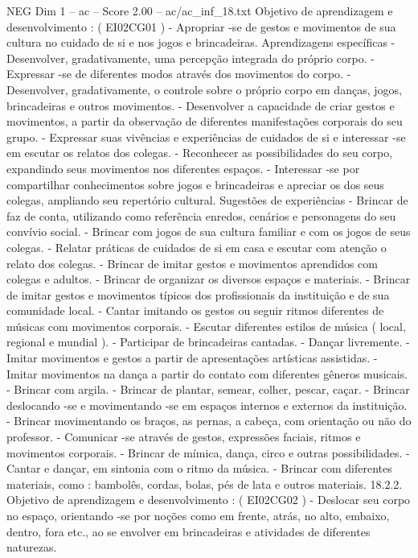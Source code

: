 \begin{textsample}{NEG Dim 1 – ac – Score 2.00 – ac/ac\_inf\_18.txt}
Objetivo de aprendizagem e desenvolvimento : ( EI02CG01 ) - Apropriar -se de gestos e movimentos de sua cultura no cuidado de si e nos jogos e brincadeiras.
Aprendizagens específicas - Desenvolver, gradativamente, uma percepção integrada do próprio corpo. - Expressar -se de diferentes modos através dos movimentos do corpo. - Desenvolver, gradativamente, o controle sobre o próprio corpo em danças, jogos, brincadeiras e outros movimentos. - Desenvolver a capacidade de criar gestos e movimentos, a partir da observação de diferentes manifestações corporais do seu grupo. - Expressar suas vivências e experiências de cuidados de si e interessar -se em escutar os relatos dos colegas. - Reconhecer as possibilidades do seu corpo, expandindo seus movimentos nos diferentes espaços. - Interessar -se por compartilhar conhecimentos sobre jogos e brincadeiras e apreciar os dos seus colegas, ampliando seu repertório cultural.
Sugestões de experiências - Brincar de faz de conta, utilizando como referência enredos, cenários e personagens do seu convívio social. - Brincar com jogos de sua cultura familiar e com os jogos de seus colegas. - Relatar práticas de cuidados de si em casa e escutar com atenção o relato dos colegas. - Brincar de imitar gestos e movimentos aprendidos com colegas e adultos. - Brincar de organizar os diversos espaços e materiais. - Brincar de imitar gestos e movimentos típicos dos profissionais da instituição e de sua comunidade local. - Cantar imitando os gestos ou seguir ritmos diferentes de músicas com movimentos corporais. - Escutar diferentes estilos de música ( local, regional e mundial ). - Participar de brincadeiras cantadas. - Dançar livremente. - Imitar movimentos e gestos a partir de apresentações artísticas assistidas. - Imitar movimentos na dança a partir do contato com diferentes gêneros musicais. - Brincar com argila. - Brincar de plantar, semear, colher, pescar, caçar. - Brincar deslocando -se e movimentando -se em espaços internos e externos da instituição. - Brincar movimentando os braços, as pernas, a cabeça, com orientação ou não do professor. - Comunicar -se através de gestos, expressões faciais, ritmos e movimentos corporais. - Brincar de mímica, dança, circo e outras possibilidades. - Cantar e dançar, em sintonia com o ritmo da música. - Brincar com diferentes materiais, como : bambolês, cordas, bolas, pés de lata e outros materiais. 18.2.2.
Objetivo de aprendizagem e desenvolvimento : ( EI02CG02 ) - Deslocar seu corpo no espaço, orientando -se por noções como em frente, atrás, no alto, embaixo, dentro, fora etc., ao se envolver em brincadeiras e atividades de diferentes naturezas.

\end{textsample}

